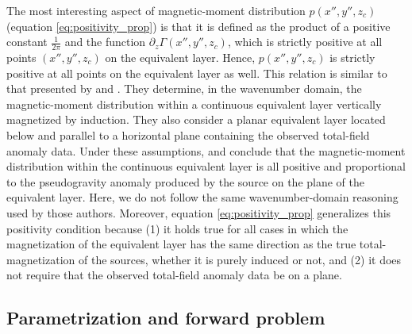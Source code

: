 The most interesting aspect of magnetic-moment distribution $p(x'', y'', z_{c})$
(equation \ref{eq:positivity_prop}) is that it is defined as the product of a
positive constant $\frac{1}{2\pi}$ and the 
function $\partial_{z} \Gamma(x'',y'',z_{c})$, which is strictly  
positive at all points $(x'',y'',z_{c})$ on the equivalent layer. 
Hence, $p(x'', y'', z_{c})$ is strictly positive at all points on the
equivalent layer as well.
This relation is similar to that presented by \cite{pedersen1991} and 
\cite{li_etal_2014}. They determine, in the wavenumber domain, the 
magnetic-moment distribution within a continuous equivalent layer 
vertically magnetized by induction. 
They also consider a planar equivalent layer located below and parallel to a 
horizontal plane containing the observed total-field anomaly data. 
Under these assumptions, \cite{pedersen1991} and \cite{li_etal_2014} 
conclude that the magnetic-moment distribution within the continuous equivalent 
layer is all positive and proportional to the pseudogravity anomaly produced by 
the source on the plane of the equivalent layer.
Here, we do not follow the same wavenumber-domain 
reasoning used by those authors. Moreover, equation \ref{eq:positivity_prop} 
generalizes this positivity condition because (1) it holds true for all cases 
in which the magnetization of the equivalent layer has the same direction as 
the true total-magnetization of the sources, whether it is purely induced or not, 
and (2) it does not require that the observed total-field anomaly data be on 
a plane. 


\subsection{Parametrization and forward problem}

